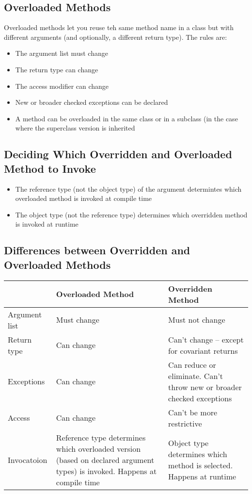 \subsection{Overloaded Methods}
Overloaded methods let you reuse teh same method name in a class but with 
different arguments (and optionally, a different return type). The rules are:
\begin{itemize}
    \item The argument list must change
    \item The return type can change
    \item The access modifier can change
    \item New or broader checked exceptions can be declared
    \item A method can be overloaded in the same class or in a subclass (in the 
    case where the superclass version is inherited
\end{itemize}

\subsection{Deciding Which Overridden and Overloaded Method to Invoke}
\begin{itemize}
    \item The reference type (not the object type) of the argument determintes 
    which overloaded method is invoked at compile time
    \item The object type (not the reference type) determines which overridden 
    method is invoked at runtime
\end{itemize}

\subsection{Differences between Overridden and Overloaded Methods}
\begin{center}
\begin{tabular}{lp{6cm}p{6cm}}
    & \textbf{Overloaded Method} & \textbf{Overridden Method} \\
    \hline
    Argument list & Must change & Must not change \\
    \hline
    Return type & Can change & Can't change -- except for covariant returns \\
    \hline
    Exceptions & Can change & Can reduce or eliminate. Can't throw new or 
    broader checked exceptions \\
    \hline
    Access & Can change & Can't be more restrictive \\
    \hline
    Invocatoion & Reference type determines which overloaded version (based on 
    declared argument types) is invoked. Happens at compile time & Object type 
    determines which method is selected. Happens at runtime \\
\end{tabular}
\end{center}

